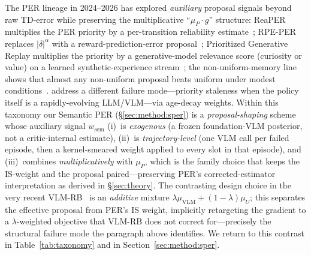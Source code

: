 \documentclass{article}
\begin{document}
The PER lineage in 2024--2026 has explored \emph{auxiliary} proposal signals
beyond raw TD-error while preserving the multiplicative
``$\mu_P\!\cdot\!g$'' structure: ReaPER multiplies the PER priority by a
per-transition reliability estimate~\citep{pleiss2025reaper};
RPE-PER replaces $|\delta|^\alpha$ with a reward-prediction-error
proposal~\citep{yamani2025rpeper}; Prioritized Generative Replay
multiplies the priority by a generative-model relevance score (curiosity
or value) on a learned synthetic-experience
stream~\citep{wang2025prioritizedgenerative}; the non-uniform-memory line
shows that almost any non-uniform proposal beats uniform under modest
conditions~\citep{krutsylo2025nonuniform}.
\citet{ma2026freshness} address a different failure mode---priority staleness
when the policy itself is a rapidly-evolving LLM/VLM---via age-decay
weights. Within this taxonomy our Semantic PER (\S\ref{sec:method:sper}) is
a \emph{proposal-shaping} scheme whose auxiliary signal $w_{\text{sem}}$
(i)~is \emph{exogenous} (a frozen foundation-VLM posterior, not a
critic-internal estimate), (ii)~is \emph{trajectory-level} (one VLM call
per failed episode, then a kernel-smeared weight applied to every slot in
that episode), and (iii)~combines \emph{multiplicatively} with $\mu_P$,
which is the family choice that keeps the IS-weight and the proposal
paired---preserving PER's corrected-estimator interpretation as derived
in \S\ref{sec:theory}. The contrasting design choice in the very recent
VLM-RB~\citep{sharony2026vlmrb} is an \emph{additive} mixture
$\lambda\mu_{\text{VLM}}\!+\!(1-\lambda)\mu_U$; this separates the
effective proposal from PER's IS weight, implicitly retargeting the
gradient to a $\lambda$-weighted objective that VLM-RB does not correct
for---precisely the structural failure mode the paragraph above identifies.
We return to this contrast in Table~\ref{tab:taxonomy} and in
Section~\ref{sec:method:sper}.
\end{document}
